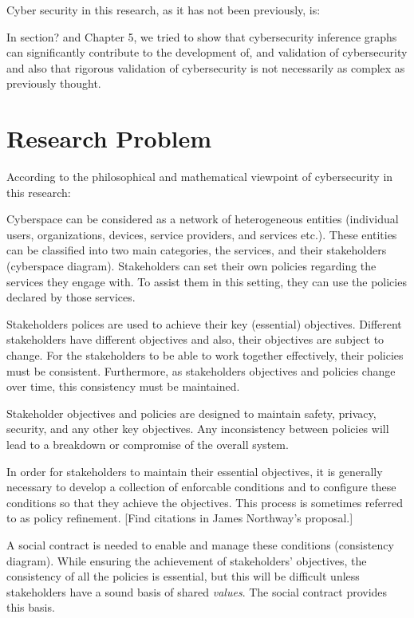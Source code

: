 Cyber security in this research, as it has not been previously, is:
{In section? and Chapter 5, we tried to show that cybersecurity inference graphs can significantly contribute to the development of, and validation of cybersecurity and also that rigorous validation of cybersecurity is not necessarily as complex as previously thought.


\section{Research Problem}
According to the philosophical and mathematical viewpoint of cybersecurity in this research:

Cyberspace can be considered as a network of heterogeneous entities
(individual users, organizations, devices, service providers, and
services etc.). These entities can be classified into two main categories,
the services, and their stakeholders (cyberspace diagram).  Stakeholders
can set their own policies regarding the services they engage with. To
assist them in this setting, they can use the policies declared by
those services.

Stakeholders polices are used to achieve their key (essential)
objectives. Different stakeholders have different objectives and also,
their objectives are subject to change.  For the stakeholders to be
able to work together effectively, their policies must be consistent.
Furthermore, as stakeholders objectives and policies change over time,
this consistency must be maintained.

Stakeholder objectives and policies are designed to maintain safety, privacy, security,
and any other key objectives. Any inconsistency between policies will lead
to a breakdown or compromise of the overall system.

In order for stakeholders to maintain their essential objectives, it is
generally necessary to develop a collection of enforcable conditions and to configure these conditions so that they achieve the objectives. This process is sometimes referred to as policy refinement. [Find citations in James Northway's
proposal.]

A social contract is needed to enable and manage these conditions (consistency diagram).  While ensuring the achievement of stakeholders’ objectives, the consistency of all the policies is essential, but this will be difficult unless stakeholders have a sound basis of shared {\em values}. The social contract provides this basis.
}
